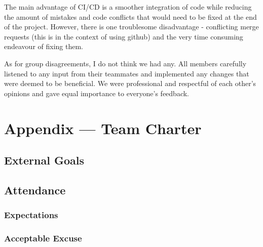\documentclass{article}
\begin{document}
The main advantage of CI/CD is a smoother integration of code while reducing the amount of mistakes and code conflicts that would need to be fixed at the end of the project. However, there is one troublesome disadvantage - conflicting merge requests (this is in the context of using github) and the very time consuming endeavour of fixing them. 

As for group disagreements, I do not think we had any. All members carefully listened to any input from their teammates and implemented any changes that were deemed to be beneficial. We were professional and respectful of each other’s opinions and gave equal importance to everyone’s feedback. \\


\newpage{}

\section*{Appendix --- Team Charter}


\subsection*{External Goals}


\subsection*{Attendance}

\subsubsection*{Expectations}


\subsubsection*{Acceptable Excuse}
\end{document}
